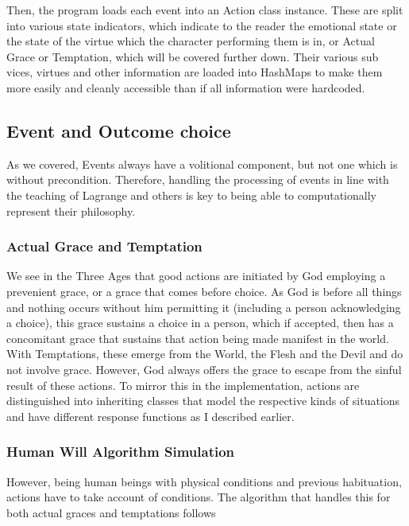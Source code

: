 \documentclass[11pt]{article}
\begin{document}
Then, the program loads each event into an Action class instance. These are split into various state indicators, which indicate to the reader the emotional state or the state of the virtue which the character performing them is in, or Actual Grace or Temptation, which will be covered further down. Their various sub vices, virtues and other information are loaded into HashMaps to make them more easily and cleanly accessible than if all information were hardcoded. 

\subsection{Event and Outcome choice}
As we covered, Events always have a volitional component, but not one which is without precondition. Therefore, handling the processing of events in line with the teaching of Lagrange and others is key to being able to computationally represent their philosophy. \\
\subsubsection{Actual Grace and Temptation}
We see in the Three Ages \cite{garrigou2013three} that good actions are initiated by God employing a prevenient grace, or a grace that comes before choice. As God is before all things and nothing occurs without him permitting it (including a person acknowledging a choice), this grace sustains a choice in a person, which if accepted, then has a concomitant grace that sustains that action being made manifest in the world. With Temptations, these emerge from the World, the Flesh and the Devil and do not involve grace. However, God always offers the grace to escape from the sinful result of these actions. To mirror this in the implementation, actions are distinguished into inheriting classes that model the respective kinds of situations and have different response functions as I described earlier. \\

\subsubsection{Human Will Algorithm Simulation}
However, being human beings with physical conditions and previous habituation, actions have to take account of conditions. The algorithm that handles this for both actual graces and temptations follows\:
\end{document}
